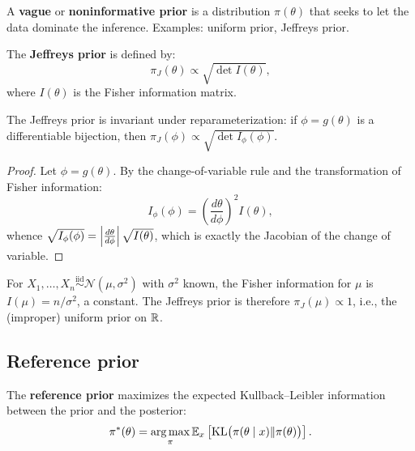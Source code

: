 \begin{definition}
A \textbf{vague} or \textbf{noninformative prior} is a distribution
$\pi(\theta)$ that seeks to let the data dominate the inference.
Examples: uniform prior, Jeffreys prior.
\end{definition}

\begin{definition}
The \textbf{Jeffreys prior} is defined by:
\[
  \pi_J(\theta) \propto \sqrt{\det I(\theta)},
\]
where $I(\theta)$ is the Fisher information matrix.
\end{definition}

\begin{proposition}
The Jeffreys prior is invariant under reparameterization: if
$\phi = g(\theta)$ is a differentiable bijection, then
$\pi_J(\phi) \propto \sqrt{\det I_\phi(\phi)}$.
\end{proposition}

\begin{proof}
Let $\phi = g(\theta)$. By the change-of-variable rule and the
transformation of Fisher information:
\[
  I_\phi(\phi) = \left(\frac{d\theta}{d\phi}\right)^2 I(\theta),
\]
whence $\sqrt{I_\phi(\phi)} = \left| \frac{d\theta}{d\phi} \right| \sqrt{I(\theta)}$,
which is exactly the Jacobian of the change of variable.
\end{proof}

\begin{example}
For $X_1, \ldots, X_n \overset{\text{iid}}{\sim} \mathcal{N}(\mu, \sigma^2)$
with $\sigma^2$ known, the Fisher information for $\mu$ is
$I(\mu) = n/\sigma^2$, a constant. The Jeffreys prior is therefore
$\pi_J(\mu) \propto 1$, i.e., the (improper) uniform prior on $\mathbb{R}$.
\end{example}

\subsection{Reference prior}

\begin{definition}
The \textbf{reference prior} maximizes the expected Kullback--Leibler
information between the prior and the posterior:
\[
  \pi^*(\theta) = \operatorname*{arg\,max}_{\pi} \mathbb{E}_x\left[\mathrm{KL}\big(\pi(\theta \mid x) \| \pi(\theta)\big)\right].
\]
\end{definition}

